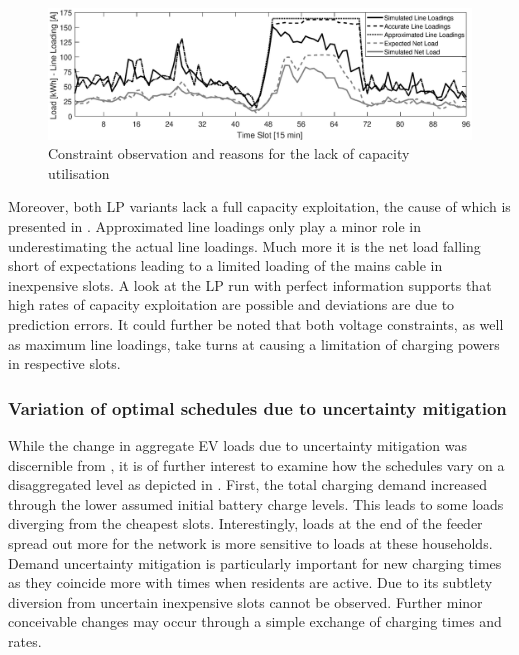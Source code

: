 \begin{figure}[]
	\includegraphics[width=\textwidth,trim={2cm 0.0cm 1.5cm 0cm},clip]{figures/evaluation/scen/constraints.eps}
	\caption{Constraint observation and reasons for the lack of capacity utilisation}
	\label{fig:constraints}
\end{figure}

Moreover, both LP variants lack a full capacity exploitation, the cause of which is presented in . Approximated line loadings only play a minor role in underestimating the actual line loadings. Much more it is the net load falling short of expectations leading to a limited loading of the mains cable in inexpensive slots. A look at the LP run with perfect information supports that high rates of capacity exploitation are possible and deviations are due to prediction errors. It could further be noted that both voltage constraints, as well as maximum line loadings, take turns at causing a limitation of charging powers in respective slots.

\subsubsection*{Variation of optimal schedules due to uncertainty mitigation}

While the change in aggregate EV loads due to uncertainty mitigation was discernible from , it is of further interest to examine how the schedules vary on a disaggregated level as depicted in . First, the total charging demand increased through the lower assumed initial battery charge levels. This leads to some loads diverging from the cheapest slots. Interestingly, loads at the end of the feeder spread out more for the network is more sensitive to loads at these households. Demand uncertainty mitigation is particularly important for new charging times as they coincide more with times when residents are active. Due to its subtlety diversion from uncertain inexpensive slots cannot be observed. Further minor conceivable changes may occur through a simple exchange of charging times and rates.

